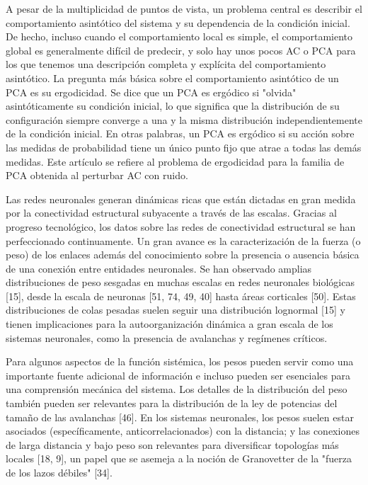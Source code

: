 A pesar de la multiplicidad de puntos de vista, un problema central es describir el comportamiento asintótico del sistema y su dependencia de la condición inicial. De hecho, incluso cuando el comportamiento local es simple, el comportamiento global es generalmente difícil de predecir, y solo hay unos pocos AC o PCA para los que tenemos una descripción completa y explícita del comportamiento asintótico.
La pregunta más básica sobre el comportamiento asintótico de un PCA es su ergodicidad. Se dice que un PCA es ergódico si "olvida" asintóticamente su condición inicial, lo que significa que la distribución de su configuración siempre converge a una y la misma distribución independientemente de la condición inicial. En otras palabras, un PCA es ergódico si su acción sobre las medidas de probabilidad tiene un único punto fijo que atrae a todas las demás medidas. Este artículo se refiere al problema de ergodicidad para la familia de PCA obtenida al perturbar AC con ruido.




Las redes neuronales generan dinámicas ricas que están dictadas en gran medida por la conectividad estructural subyacente a través de las escalas. Gracias al progreso tecnológico, los datos sobre las redes de conectividad estructural se han perfeccionado continuamente. Un gran avance es la caracterización de la fuerza (o peso) de los enlaces además del conocimiento sobre la presencia o ausencia básica de una conexión entre entidades neuronales.  Se han observado amplias distribuciones de peso sesgadas en muchas escalas en redes neuronales biológicas [15], desde la escala de neuronas [51, 74, 49, 40] hasta áreas corticales [50]. Estas distribuciones de colas pesadas suelen seguir una distribución lognormal [15] y tienen implicaciones para la autoorganización dinámica a gran escala de los sistemas neuronales, como la presencia de avalanchas y regímenes críticos. 



Para algunos aspectos de la función sistémica, los pesos pueden servir como una importante fuente adicional de información e incluso pueden ser esenciales para una comprensión mecánica del sistema. Los detalles de la distribución del peso también pueden ser relevantes para la distribución de la ley de potencias del tamaño de las avalanchas [46]. En los sistemas neuronales, los pesos suelen estar asociados (específicamente, anticorrelacionados) con la distancia; y las conexiones de larga distancia y bajo peso son relevantes para diversificar topologías más locales [18, 9], un papel que se asemeja a la noción de Granovetter de la "fuerza de los lazos débiles" [34].


